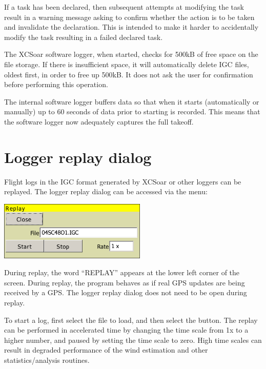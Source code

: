 \documentclass[a4paper,12pt]{refrep}
\begin{document}
If a task has been declared, then subsequent attempts at modifying the
task result in a warning message asking to confirm whether the action
is to be taken and invalidate the declaration.  This is intended to
make it harder to accidentally modify the task resulting in a failed
declared task.

The XCSoar software logger, when started, checks for 500kB of free
space on the file storage.  If there is insufficient space, it will
automatically delete IGC files, oldest first, in order to free up
500kB.  It does not ask the user for confirmation before performing
this operation.

The internal software logger buffers data so that when it starts
(automatically or manually) up to 60 seconds of data prior to starting
is recorded.  This means that the software logger now adequately
captures the full takeoff.

\section{Logger replay dialog}

Flight logs in the IGC format generated by XCSoar or other loggers can
be replayed.  The logger replay dialog can be accessed via the
menu:
\begin{quote}
\blink{}\blink{}
\end{quote}

\begin{center}
\includegraphics[angle=0,width=7cm,keepaspectratio='true']{figures/loggerreplay.png}
\end{center}

During replay, the word ``REPLAY'' appears at the lower left corner of
the screen.  During replay, the program behaves as if real GPS updates
are being received by a GPS.  The logger replay dialog does not need
to be open during replay.

To start a log, first select the file to load, and then select the
 button.  The replay can be performed in accelerated time
by changing the time scale from 1x to a higher number, and paused by
setting the time scale to zero.  High time scales can result in degraded
performance of the wind estimation and other statistics/analysis routines.
\end{document}

